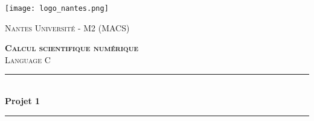 \begin{titlepage}

    \newcommand{\HRule}{\rule{\linewidth}{0.5mm}} %
    
    \center
    \texttt{[image: logo\_nantes.png]}\\[1cm] %
     
    
    \center %
    
    
    
    \textsc{\LARGE Nantes Université - M2 (MACS)  }\\[1.5cm] %
    
    \vspace{1cm}
    
    \textsc{\Large \textbf{Calcul scientifique numérique} }\\[0.5cm] %
    \textsc{\large  Language C}\\[0.5cm] %
    
    
    \vspace{2cm} 
    
    \makeatletter
    \HRule \\[0.4cm]
    { \huge \bfseries Projet 1}\\[0.4cm] %
    \HRule \\[1.5cm]
     
    

\end{titlepage}
